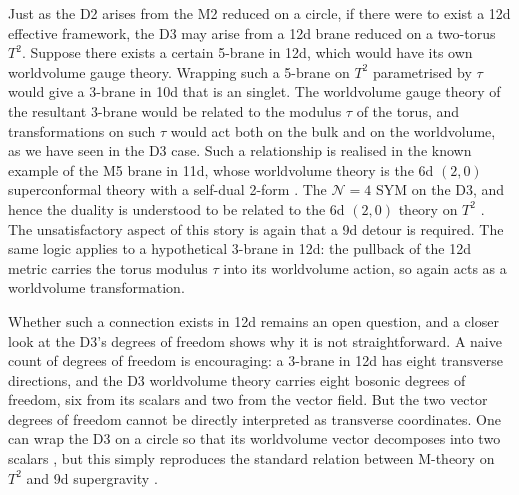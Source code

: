 Just as the D2 arises from the M2 reduced on a circle, if there were to exist a 12d effective framework, the D3 may arise from a 12d brane reduced on a two-torus $T^2$.
Suppose there exists a certain 5-brane in 12d, which would have its own worldvolume gauge theory.
Wrapping such a 5-brane on $T^2$ parametrised by $\tau$ would give a 3-brane in 10d that is an \SLZ{} singlet.
The worldvolume gauge theory of the resultant 3-brane would be related to the modulus $\tau$ of the torus, and \SLZ{} transformations on such $\tau$ would act both on the bulk and on the worldvolume, as we have seen in the D3 case.
Such a relationship is realised in the known example of the M5 brane in 11d, whose worldvolume theory is the 6d $(2,0)$ superconformal theory with a self-dual 2-form \cite{Witten:1995zh}.
The $\mathcal N = 4$ SYM on the D3, and hence the \SLZ{} duality is understood to be related to the 6d $(2,0)$ theory on $T^2$ \cite{Witten:2007ct}. 
The unsatisfactory aspect of this story is again that a 9d detour is required.
The same logic applies to a hypothetical 3-brane in 12d: the pullback of the 12d metric carries the torus modulus $\tau$ into its worldvolume action, so \SLZ{} again acts as a worldvolume transformation.

Whether such a connection exists in 12d remains an open question, and a closer look at the D3's degrees of freedom shows why it is not straightforward.
A naive count of degrees of freedom is encouraging: a 3-brane in 12d has eight transverse directions, and the D3 worldvolume theory carries eight bosonic degrees of freedom, six from its scalars and two from the vector field.
But the two vector degrees of freedom cannot be directly interpreted as transverse coordinates.
One can wrap the D3 on a circle so that its worldvolume vector decomposes into two scalars \cite{Jatkar:1996np,Kar:1997cx}, but this simply reproduces the standard relation between M-theory on $T^2$ and 9d supergravity \cite{Green:1997as}.


